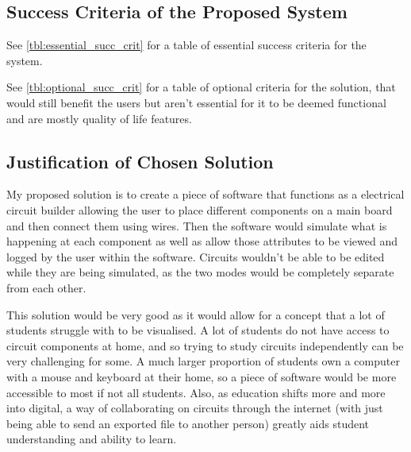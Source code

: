 \documentclass[11pt]{article}
\begin{document}
        \subsection{Success Criteria of the Proposed System}
            See \autoref{tbl:essential_succ_crit} for a table of essential success criteria for the system. 


            See \autoref{tbl:optional_succ_crit} for a table of optional criteria for the solution, that would still benefit the users but aren't essential for it to be deemed functional and are mostly quality of life features.
        
        

        \subsection{Justification of Chosen Solution}
            My proposed solution is to create a piece of software that functions as a electrical circuit builder allowing the user to place different components on a main board and then connect them using wires. Then the software would simulate what is happening at each component as well as allow those attributes to be viewed and logged by the user within the software. Circuits wouldn't be able to be edited while they are being simulated, as the two modes would be completely separate from each other.

            This solution would be very good as it would allow for a concept that a lot of students struggle with to be visualised. A lot of students do not have access to circuit components at home, and so trying to study circuits independently can be very challenging for some. A much larger proportion of students own a computer with a mouse and keyboard at their home, so a piece of software would be more accessible to most if not all students. Also, as education shifts more and more into digital, a way of collaborating on circuits through the internet (with just being able to send an exported file to another person) greatly aids student understanding and ability to learn.
\end{document}
